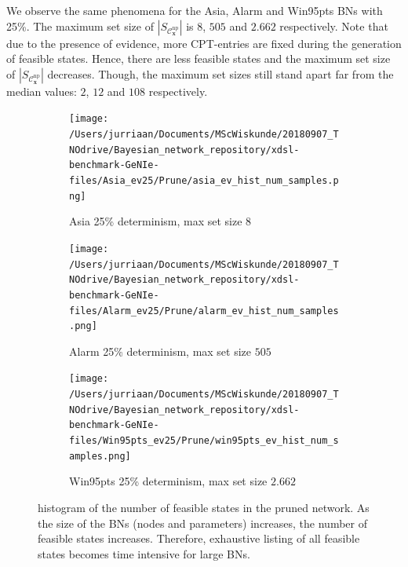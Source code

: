 \documentclass[a4paper, twoside, 11pt]{report}
\newcommand{\bfx}{{\mathbf{x}}}
\newcommand{\C}{{\mathcal C}}
\theoremstyle{plain}
\theoremstyle{definition}
\theoremstyle{remark}
\begin{document}
We observe the same phenomena for the Asia, Alarm and Win95pts BNs with 25\%. The maximum set size of $|S_{\C_\bfx^{\text{np}}}|$ is $8$, $505$ and $2.662$ respectively. Note that due to the presence of evidence, more CPT-entries are fixed during the generation of feasible states. Hence, there are less feasible states and the maximum set size of $|S_{\C_\bfx^{\text{np}}}|$ decreases. Though, the maximum set sizes still stand apart far from the median values: $2$, $12$ and $108$ respectively.
\begin{figure}[h!]
\centering
\captionsetup[subfigure]{justification=centering}

\begin{subfigure}{.3\linewidth}
\texttt{[image: /Users/jurriaan/Documents/MScWiskunde/20180907\_TNOdrive/Bayesian\_network\_repository/xdsl-benchmark-GeNIe-files/Asia\_ev25/Prune/asia\_ev\_hist\_num\_samples.png]}
\caption{Asia 25\% determinism, max set size $8$}%
\label{asia_ev}%
\end{subfigure}\hfill%
\begin{subfigure}{.3\linewidth}
\texttt{[image: /Users/jurriaan/Documents/MScWiskunde/20180907\_TNOdrive/Bayesian\_network\_repository/xdsl-benchmark-GeNIe-files/Alarm\_ev25/Prune/alarm\_ev\_hist\_num\_samples.png]}
\caption{Alarm 25\% determinism, max set size $505$}%
\label{alarm_ev}%
\end{subfigure}\hfill%
\begin{subfigure}{.3\linewidth}
\texttt{[image: /Users/jurriaan/Documents/MScWiskunde/20180907\_TNOdrive/Bayesian\_network\_repository/xdsl-benchmark-GeNIe-files/Win95pts\_ev25/Prune/win95pts\_ev\_hist\_num\_samples.png]}
\caption{Win95pts 25\% determinism, max set size $2.662$}%
\label{win95pts_ev}%
\end{subfigure}\hfill%

\vspace{0.75pc}
\caption{histogram of the number of feasible states in the pruned network. As the size of the BNs (nodes and parameters) increases, the number of feasible states increases. Therefore, exhaustive listing of all feasible states becomes time intensive for large BNs.}
\label{results5}
\end{figure}
\end{document}
